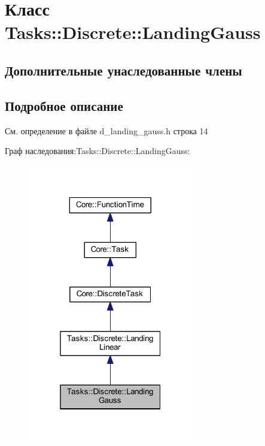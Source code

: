 \hypertarget{class_tasks_1_1_discrete_1_1_landing_gauss}{}\section{Класс Tasks\+:\+:Discrete\+:\+:Landing\+Gauss}
\label{class_tasks_1_1_discrete_1_1_landing_gauss}
\subsection*{Дополнительные унаследованные члены}


\subsection{Подробное описание}


См. определение в файле d\+\_\+landing\+\_\+gauss.\+h строка 14



Граф наследования\+:Tasks\+:\+:Discrete\+:\+:Landing\+Gauss\+:
\nopagebreak
\begin{figure}[H]
\begin{center}
\leavevmode
\includegraphics[width=205pt]{class_tasks_1_1_discrete_1_1_landing_gauss__inherit__graph}
\end{center}
\end{figure}


